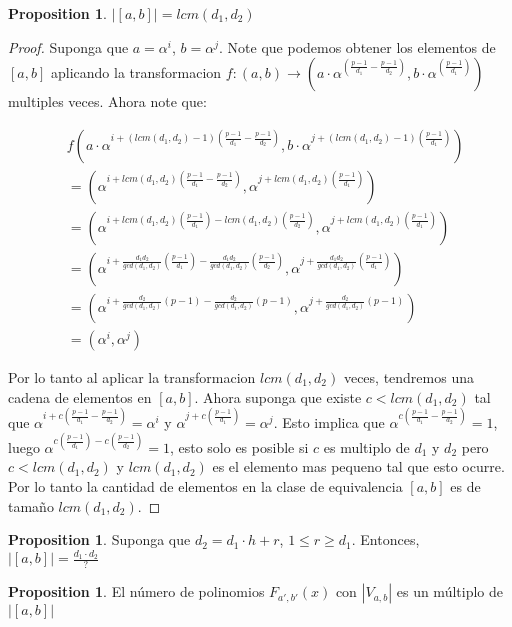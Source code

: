 \documentclass{article}
\theoremstyle{definition}
\newtheorem{prop}[theorem]{Proposition}
\theoremstyle{remark}
\numberwithin{equation}{section}
\begin{document}
\begin{prop}
  
  $|[a, b]| = lcm(d_1,d_2)$

\end{prop}

\begin{proof}

  Suponga que $a=\alpha^i$, $b=\alpha^j$. Note que podemos obtener los elementos de $[a,b]$ aplicando la transformacion $f:(a,b) \rightarrow ( a\cdot\alpha^{(\frac{p-1}{d_1} - \frac{p-1}{d_2})}, b\cdot\alpha^{(\frac{p-1}{d_1})} )$ multiples veces. Ahora note que:

  \begin{align*}
  & f(a\cdot \alpha^{i+(lcm(d_1,d_2) - 1)(\frac{p-1}{d_1} - \frac{p-1}{d_2})}, b\cdot\alpha^{j+(lcm(d_1,d_2) - 1)(\frac{p-1}{d_1})}) \\
  & = (\alpha^{i+lcm(d_1,d_2)(\frac{p-1}{d_1}-\frac{p-1}{d_2})}, \alpha^{j+lcm(d_1,d_2)(\frac{p-1}{d_1})}) \\
  & = (\alpha^{i+lcm(d_1,d_2)(\frac{p-1}{d_1})-lcm(d_1,d_2)(\frac{p-1}{d_2})}, \alpha^{j+lcm(d_1,d_2)(\frac{p-1}{d_1})}) \\
    & = (\alpha^{i+\frac{d_1d_2}{gcd(d_1,d_2)}(\frac{p-1}{d_1})-\frac{d_1d_2}{gcd(d_1,d_2)}(\frac{p-1}{d_2})}, \alpha^{j+\frac{d_1d_2}{gcd(d_1,d_2)}(\frac{p-1}{d_1})}) \\
  & = (\alpha^{i+\frac{d_2}{gcd(d_1,d_2)}(p-1)-\frac{d_2}{gcd(d_1,d_2)}(p-1)}, \alpha^{j+\frac{d_2}{gcd(d_1,d_2)}(p-1)}) \\
  & = (\alpha^i, \alpha^j)
  \end{align*}

  Por lo tanto al aplicar la transformacion $lcm(d_1,d_2)$ veces, tendremos una cadena de elementos en $[a,b]$. Ahora suponga que existe $c < lcm(d_1,d_2)$ tal que $\alpha^{i+c(\frac{p-1}{d_1} - \frac{p-1}{d_2})} = \alpha^i$ y $\alpha^{j+c(\frac{p-1}{d_1})} = \alpha^j$. Esto implica que $\alpha^{c(\frac{p-1}{d_1} - \frac{p-1}{d_2})} = 1$, luego $\alpha^{c(\frac{p-1}{d_1}) - c(\frac{p-1}{d_2})} = 1$, esto solo es posible si $c$ es multiplo de $d_1$ y $d_2$ pero $c < lcm(d_1,d_2)$ y $lcm(d_1,d_2)$ es el elemento mas pequeno tal que esto ocurre. Por lo tanto la cantidad de elementos en la clase de equivalencia $[ a,b]$ es de tama\~no $lcm(d_1,d_2)$.
  
\end{proof}

\begin{prop}
  
  Suponga que $d_2 = d_1 \cdot h + r$, $1 \leq r \geq d_1$. Entonces, $|[a, b]| = 
  \frac{d_1 \cdot d_2}{?}$

\end{prop}

\begin{prop}

  El n\'umero de polinomios $F_{a', b'}(x)$ con $|V_{a, b}|$ es un m\'ultiplo de $|[a, b]|$

\end{prop}

 
  
\end{document}
